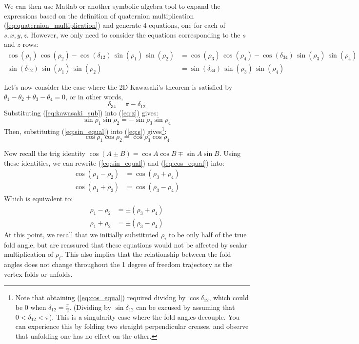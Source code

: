\documentclass[11pt]{article}
\begin{document}
We can then use Matlab or another symbolic algebra tool to expand the expressions based on the definition of quaternion multiplication (\ref{eq:quaternion_multiplication}) and generate 4 equations, one for each of $s,x,y,z$. However, we only need to consider the equations corresponding to the $s$ and $z$ rows:
\begin{align}
    \cos \left(\rho_1 \right)\,\cos \left(\rho_2 \right)-\cos \left(\delta_{12} \right)\,\sin \left(\rho_1 \right)\,\sin \left(\rho_2 \right) &= \cos \left(\rho_3 \right)\,\cos \left(\rho_4 \right)-\cos \left(\delta_{34} \right)\,\sin \left(\rho_3 \right)\,\sin \left(\rho_4 \right) \label{eq:s}\\
    \sin \left(\delta_{12} \right)\,\sin \left(\rho_1 \right)\,\sin \left(\rho_2 \right) &=\sin \left(\delta_{34} \right)\,\sin \left(\rho_3 \right)\,\sin \left(\rho_4 \right)\label{eq:z}
\end{align}

Let's now consider the case where the 2D Kawasaki's theorem is satisfied by $\theta_1 - \theta_2 + \theta_3 -\theta_4 =0$, or in other words, 
\begin{equation}\label{eq:kawasaki_sub}
    \delta_{34} = \pi - \delta_{12}
\end{equation}
Substituting (\ref{eq:kawasaki_sub}) into (\ref{eq:z}) gives:
\begin{equation}\label{eq:sin_equal}
    \sin \rho_1 \sin \rho_2 = -\sin \rho_3 \sin \rho_4
\end{equation}
Then, substituting (\ref{eq:sin_equal}) into (\ref{eq:s}) gives\footnote{Note that obtaining (\ref{eq:cos_equal}) required dividng by $\cos\delta_{12}$, which could be $0$ when $\delta_{12} = \frac{\pi}{2}$. (Dividing by $\sin\delta_{12}$ can be excused by assuming that $0<\delta_{12}<\pi$). This is a singularity case where the fold angles decouple. You can experience this by folding two straight perpendicular creases, and observe that unfolding one has no effect on the other.}:
\begin{equation}\label{eq:cos_equal}
    \cos \rho_1 \cos \rho_2 = \cos \rho_3 \cos \rho_4
\end{equation}


Now recall the trig identity $\cos(A\pm B) = \cos A \cos B \mp \sin A \sin B$. Using these identities, we can rewrite (\ref{eq:sin_equal}) and (\ref{eq:cos_equal}) into:
\begin{align}
    \cos(\rho_1-\rho_2)&= \cos(\rho_3+\rho_4)\\
    \cos(\rho_1+\rho_2) &= \cos(\rho_3-\rho_4)
\end{align}
Which is equivalent to:
\begin{align}
    \rho_1-\rho_2 &= \pm(\rho_3 + \rho_4)\label{eq:A}\\
    \rho_1+\rho_2 &= \pm(\rho_3 - \rho_4)\label{eq:B}
\end{align}
At this point, we recall that we initially substituted $\rho_i$ to be only half of the true fold angle, but are reassured that these equations would not be affected by scalar multiplication of $\rho_i$. This also implies that the relationship between the fold angles does not change throughout the 1 degree of freedom trajectory as the vertex folds or unfolds. 
\end{document}
